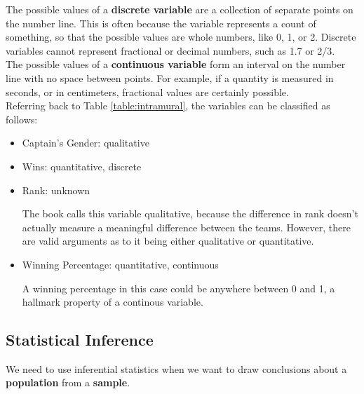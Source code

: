 \documentclass[12pt,openany]{book}
\begin{document}
	\noindent The possible values of a \textbf{discrete variable} are a collection of separate points on the number line. This is often because the variable represents a count of something, so that the possible values are whole numbers, like 0, 1, or 2. Discrete variables cannot represent fractional or decimal numbers, such as 1.7 or 2/3.\\

	\noindent The possible values of a \textbf{continuous variable} form an interval on the number line with no space between points. For example, if a quantity is measured in seconds, or in centimeters, fractional values are certainly possible.\\

	\noindent Referring back to Table \ref{table:intramural}, the variables can be classified as follows:

	\begin{itemize}
		\item{Captain's Gender: qualitative}
		\item{Wins: quantitative, discrete}
		\item{Rank: unknown}
		\begin{tcolorbox}[width=0.95\textwidth,colback={blue!10},title={\textbf{Why is rank marked as unknown?}},colbacktitle={blue!10},coltitle=black]
			The book calls this variable qualitative, because the difference in rank doesn't actually measure a meaningful difference between the teams. However, there are valid arguments as to it being either qualitative or quantitative. 
		\end{tcolorbox}
		\item{Winning Percentage: quantitative, continuous}
		\begin{tcolorbox}[width=0.95\textwidth,colback={blue!10},title={\textbf{Why is winning percentage continuous?}},colbacktitle={blue!10},coltitle=black]
			A winning percentage in this case could be anywhere between 0 and 1, a hallmark property of a continous variable.
		\end{tcolorbox}
	\end{itemize}

	\subsection{Statistical Inference}

	We need to use inferential statistics when we want to draw conclusions about a \textbf{population} from a \textbf{sample}.\\
\end{document}
